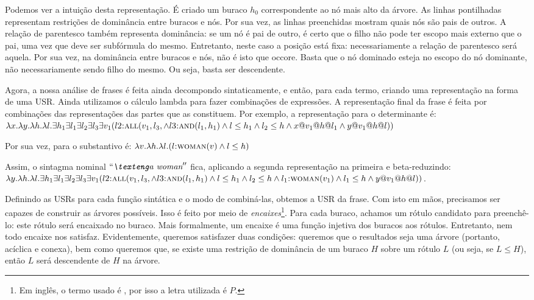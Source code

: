 Podemos ver a intuição desta representação. É criado um buraco $h_0$ correspondente ao nó mais alto da árvore. As linhas pontilhadas representam restrições de dominância entre buracos e nós. Por sua vez, as linhas preenchidas mostram quais nós são pais de outros. A relação de parentesco também representa dominância: se um nó é pai de outro, é certo que o filho não pode ter escopo mais externo que o pai, uma vez que deve ser subfórmula do mesmo. Entretanto, neste caso a posição está fixa: necessariamente a relação de parentesco será aquela. Por sua vez, na dominância entre buracos e nós, não é isto que occore. Basta que o nó dominado esteja no escopo do nó dominante, não necessariamente sendo filho do mesmo. Ou seja, basta ser descendente.

Agora, a nossa análise de frases é feita ainda decompondo sintaticamente, e então, para cada termo, criando uma representação na forma de uma USR. Ainda utilizamos o cálculo lambda para fazer combinações de expressões. A representação final da frase é feita por combinações das representações das partes que as constituem. Por exemplo, a representação para o determinante  é:
 $\lambda x. \lambda y. \lambda h. \lambda l. \exists h_1 \exists l_1 \exists l_2 \exists l_3 \exists v_1 (l2\textsc{:all}(v_1,l_3, \land l3 \textsc{:and}(l_1,h_1) \land l \leq h_1 \land l_2 \leq h \land x@v_1@h@l_1 \land y@v_1@h@l))$

Por sua vez, para o substantivo  é: $\lambda v. \lambda h. \lambda l. (l\textsc{:woman}(v) \land l \leq h  )$

Assim, o sintagma nominal $\expreng{a woman}$ fica, aplicando a segunda representação na primeira e beta-reduzindo: $\lambda y. \lambda h. \lambda l. \exists h_1 \exists l_1 \exists l_2 \exists l_3 \exists v_1 (l2\textsc{:all}(v_1,l_3, \land l3 \textsc{:and}(l_1,h_1) \land l \leq h_1 \land l_2 \leq h \land l_1\textsc{:woman}(v_1) \land l_1 \leq h \land y@v_1@h@l))$.

Definindo as USRs para cada função sintática e o modo de combiná-las, obtemos a USR da frase. Com isto em mãos, precisamos ser capazes de construir as árvores possíveis. Isso é feito por meio de \textit{encaixes}\footnote{Em inglês, o termo usado é , por isso a letra utilizada é $P$.}. Para cada buraco, achamos um rótulo candidato para preenchê-lo: este rótulo será encaixado no buraco. Mais formalmente, um encaixe é uma função injetiva dos buracos aos rótulos. Entretanto, nem todo encaixe nos satisfaz. Evidentemente, queremos satisfazer duas condições: queremos que o resultados seja uma árvore (portanto, acíclica e conexa), bem como queremos que, se existe uma restrição de dominância de um buraco $H$ sobre um rótulo $L$ (ou seja, se $L \leq H$), então $L$ será descendente de $H$ na árvore.


